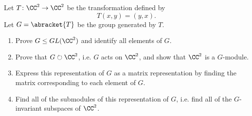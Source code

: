 \documentclass{math174}
\date{Monday, February 4}
\author{}
\begin{document}
Let \(T \colon \CC^2 \to \CC^2\) be the transformation defined by
\[
  T(x, y) = (y, x).
\]
Let \(G = \abracket{T}\) be the group generated by \(T\).
\begin{enumerate}[label=(\arabic*)]
\item Prove \(G \le GL(\CC^2)\) and identify all elements of \(G\).
\item Prove that \(G \circlearrowright \CC^2\), i.e. \(G\) acts on
  \(\CC^2\), and show that \(\CC^2\) is a \(G\)-module.
\item Express this representation of \(G\) as a matrix representation
  by finding the matrix corresponding to each element of \(G\).
\item Find all of the submodules of this representation of \(G\),
  i.e. find all of the \(G\)-invariant subspaces of \(\CC^2\).
\end{enumerate}
\end{document}
